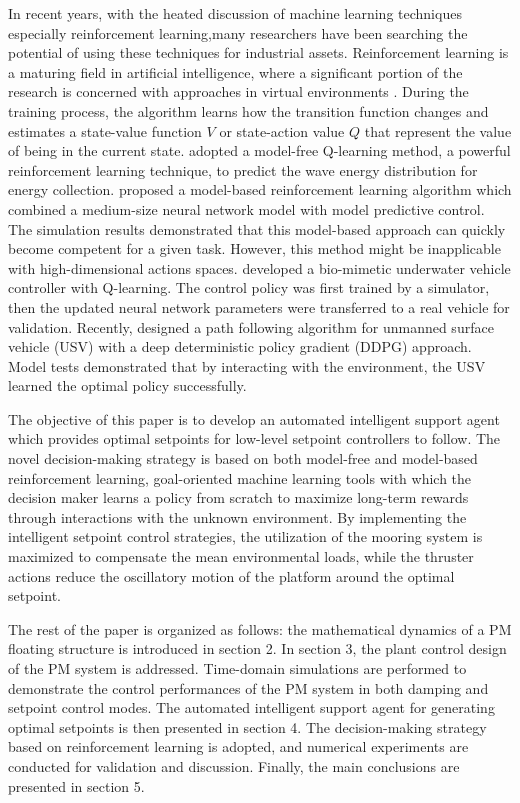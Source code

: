 \begin{sloppypar}
In recent years, with the heated discussion of machine learning techniques especially reinforcement learning,many researchers have been searching the potential of using these techniques for industrial assets. Reinforcement learning is a maturing field in artificial intelligence, where a significant portion of the research is concerned with approaches  in virtual environments \cite{sutton1999reinforcement}. During the training process, the algorithm learns how the transition function changes and estimates a state-value function $V$ or state-action value $Q$ that represent the value of being in the current state.\cite{anderlini2018reactive} adopted a model-free Q-learning method, a powerful reinforcement learning technique, to predict the wave energy distribution for energy collection.\cite{nagabandi2018neural} proposed a model-based reinforcement learning algorithm which combined a  medium-size neural network model with model predictive control. The simulation results demonstrated that this model-based approach can quickly become competent for a given task. However, this method might be inapplicable with high-dimensional actions spaces. \cite{magalhaes2018reinforcement} developed a bio-mimetic underwater vehicle controller with Q-learning. The control policy was first trained by a simulator, then the updated neural network parameters were transferred to a real vehicle for validation. Recently, \cite{woo2019deep} designed a path following algorithm for unmanned surface vehicle (USV) with a deep deterministic policy gradient (DDPG) approach. Model tests demonstrated that by interacting with the environment, the USV learned the optimal policy successfully.

The objective of this paper is to develop an automated intelligent support agent which provides optimal setpoints for low-level setpoint controllers to follow. The novel decision-making strategy is based on both model-free and model-based reinforcement learning, goal-oriented machine learning tools with which the decision maker learns a policy from scratch to maximize long-term rewards through interactions with the unknown environment. By implementing the intelligent setpoint control strategies, the utilization of the mooring system is maximized to compensate the mean environmental loads, while the thruster actions reduce the oscillatory motion of the platform around the optimal setpoint.

The rest of the paper is organized as follows: the mathematical dynamics of a PM floating structure is introduced in section 2. In section 3, the plant control design of the PM system is addressed. Time-domain simulations are performed to demonstrate the control performances of the PM system in both damping and setpoint control modes. The automated intelligent support agent for generating optimal setpoints is then presented in section 4. The decision-making strategy based on reinforcement learning is adopted, and numerical experiments are conducted for validation and discussion. Finally, the main conclusions are presented in section 5.


\end{sloppypar}
